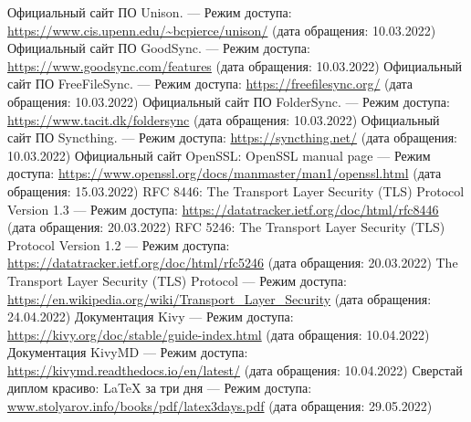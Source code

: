 \newpage
\begin{thebibliography}{99}

Официальный сайт ПО Unison. --- Режим доступа: \url{https://www.cis.upenn.edu/~bcpierce/unison/} (дата обращения: 10.03.2022)
Официальный сайт ПО GoodSync. --- Режим доступа: \url{https://www.goodsync.com/features} (дата обращения: 10.03.2022)
Официальный сайт ПО FreeFileSync. --- Режим доступа: \url{https://freefilesync.org/} (дата обращения: 10.03.2022)
Официальный сайт ПО FolderSync. --- Режим доступа: \url{https://www.tacit.dk/foldersync} (дата обращения: 10.03.2022)
Официальный сайт ПО Syncthing. --- Режим доступа: \url{https://syncthing.net/}
 (дата обращения: 10.03.2022)
Официальный сайт OpenSSL: OpenSSL manual page --- Режим доступа: \url{https://www.openssl.org/docs/manmaster/man1/openssl.html} (дата обращения: 15.03.2022)
RFC 8446: The Transport Layer Security (TLS) Protocol Version 1.3 --- Режим доступа: \url{https://datatracker.ietf.org/doc/html/rfc8446} (дата обращения: 20.03.2022)
RFC 5246: The Transport Layer Security (TLS) Protocol Version 1.2 --- Режим доступа: \url{https://datatracker.ietf.org/doc/html/rfc5246} (дата обращения: 20.03.2022)
The Transport Layer Security (TLS) Protocol --- Режим доступа:
\url{https://en.wikipedia.org/wiki/Transport\_Layer\_Security} (дата обращения: 24.04.2022)
Документация Kivy --- Режим доступа:
\url{https://kivy.org/doc/stable/guide-index.html} (дата обращения: 10.04.2022)
Документация KivyMD --- Режим доступа: \url{https://kivymd.readthedocs.io/en/latest/} (дата обращения: 10.04.2022)
Сверстай диплом красиво: LaTeX за три дня --- Режим доступа:
\url{www.stolyarov.info/books/pdf/latex3days.pdf} (дата обращения: 29.05.2022)

\end{thebibliography}

